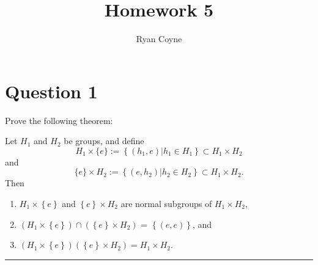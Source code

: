\documentclass[12pt]{article}
\title{Homework 5}
\author{Ryan Coyne}
\def\bar{\rule{\linewidth}{0.4pt}}
\begin{document}
\maketitle

\section*{Question 1}
Prove the following theorem:
\begin{theorem}
    Let \(H_1\) and \(H_2\) be groups, and define
    \begin{equation*}
        H_1 \times \{e\} := \left\{ (h_1, e) | h_1\in H_1 \right\} \subset H_1 \times H_2
    \end{equation*}
    and
    \begin{equation*}
       \{e\} \times H_2 := \left\{ (e, h_2) | h_2\in H_2 \right\} \subset H_1 \times H_2.
    \end{equation*}
    Then
    \begin{enumerate}[label=\alph*)]
        \item \(H_1\times \left\{ e \right\}\) and \(\left\{ e \right\} \times H_2\) are normal subgroups of \(H_1 \times H_2\),
        \item \((H_1\times \left\{ e \right\}) \cap (\left\{ e \right\}\times H_2)\) = \(\left\{ (e,e) \right\}\), and
        \item \((H_1\times\left\{ e \right\})(\left\{ e \right\}\times H_2) = H_1 \times H_2\).
    \end{enumerate}
\end{theorem}
\bar
\end{document}
